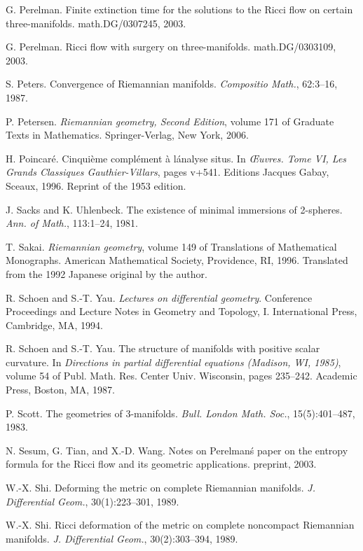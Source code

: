\begin{thebibliography}{99}
    G. Perelman. Finite extinction time for the solutions to the Ricci flow on certain three-manifolds. math.DG/0307245, 2003.

    G. Perelman. Ricci flow with surgery on three-manifolds. math.DG/0303109, 2003.

    S. Peters. Convergence of Riemannian manifolds. \textit{Compositio Math.}, 62:3–16, 1987.

    P. Petersen. \textit{Riemannian geometry, Second Edition}, volume 171 of Graduate Texts in Mathematics. Springer-Verlag, New York, 2006.

    H. Poincaré. Cinquième complément à l\'analyse situs. In \textit{Œuvres. Tome VI, Les Grands Classiques Gauthier-Villars}, pages v+541. Editions Jacques Gabay, Sceaux, 1996. Reprint of the 1953 edition.

    J. Sacks and K. Uhlenbeck. The existence of minimal immersions of 2-spheres. \textit{Ann. of Math.}, 113:1–24, 1981.

    T. Sakai. \textit{Riemannian geometry}, volume 149 of Translations of Mathematical Monographs. American Mathematical Society, Providence, RI, 1996. Translated from the 1992 Japanese original by the author.

    R. Schoen and S.-T. Yau. \textit{Lectures on differential geometry}. Conference Proceedings and Lecture Notes in Geometry and Topology, I. International Press, Cambridge, MA, 1994.

    R. Schoen and S.-T. Yau. The structure of manifolds with positive scalar curvature. In \textit{Directions in partial differential equations (Madison, WI, 1985)}, volume 54 of Publ. Math. Res. Center Univ. Wisconsin, pages 235–242. Academic Press, Boston, MA, 1987.

    P. Scott. The geometries of 3-manifolds. \textit{Bull. London Math. Soc.}, 15(5):401–487, 1983.

    N. Sesum, G. Tian, and X.-D. Wang. Notes on Perelman\'s paper on the entropy formula for the Ricci flow and its geometric applications. preprint, 2003.

    W.-X. Shi. Deforming the metric on complete Riemannian manifolds. \textit{J. Differential Geom.}, 30(1):223–301, 1989.

    W.-X. Shi. Ricci deformation of the metric on complete noncompact Riemannian manifolds. \textit{J. Differential Geom.}, 30(2):303–394, 1989.


\end{thebibliography}
